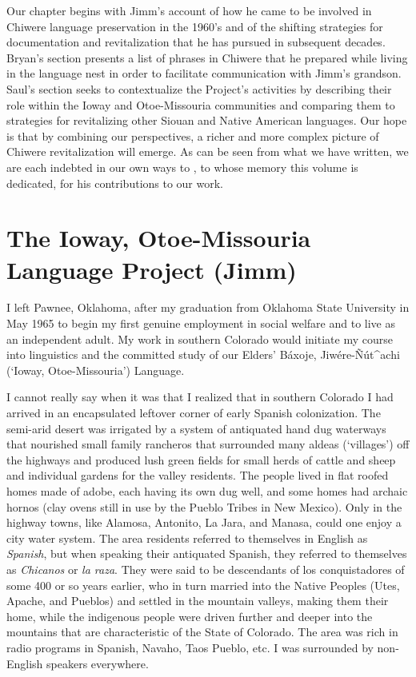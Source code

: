 \documentclass[output=paper]{LSP/langsci}
\begin{document}
Our chapter begins with Jimm's account of how he came to be involved in Chiwere language preservation in the 1960's and of the shifting strategies for documentation and revitalization that he has pursued in subsequent decades. Bryan's section presents a list of phrases in Chiwere that he prepared while living in the language nest in order to facilitate communication with Jimm's grandson. Saul's section seeks to contextualize the Project's activities by describing their role within the Ioway and Otoe-Missouria communities and comparing them to strategies for revitalizing other Siouan and Native American languages. Our hope is that by combining our perspectives, a richer and more complex picture of Chiwere revitalization will emerge. As can be seen from what we have written, we are each indebted in our own ways to , to whose memory this volume is dedicated, for his contributions to our work.

\section{The Ioway, Otoe-Missouria Language Project (Jimm)}
I left Pawnee, Oklahoma, after my graduation from Oklahoma State University in May 1965 to begin my first genuine employment in social welfare and to live as an independent adult. My work in southern Colorado would initiate my course into linguistics and the committed study of our Elders' Báxoje, Jiwére-\~Nút\^{ }achi (`Ioway, Otoe-Mis\-sou\-ria') Language.

I cannot really say when it was that I realized that in southern Colorado I had arrived in an encapsulated leftover corner of early Spanish colonization. The semi-arid desert was irrigated by a system of antiquated hand dug waterways that nourished small family rancheros that surrounded many aldeas (`villages') off the highways and produced lush green fields for small herds of cattle and sheep and individual gardens for the valley residents. The people lived in flat roofed homes made of adobe, each having its own dug well, and some homes had archaic hornos (clay ovens still in use by the Pueblo Tribes in New Mexico). Only in the highway towns, like Alamosa, Antonito, La Jara, and Manasa, could one enjoy a city water system. The area residents referred to themselves in English as \emph{Spanish}, but when speaking their antiquated Spanish, they referred to themselves as \emph{Chicanos} or \emph{la raza}. They were said to be descendants of los conquistadores of some 400 or so years earlier, who in turn married into the Native Peoples (Utes, Apache, and Pueblos) and settled in the mountain valleys, making them their home, while the indigenous people were driven further and deeper into the mountains that are characteristic of the State of Colorado. The area was rich in radio programs in Spanish, Navaho, Taos Pueblo, etc. I was surrounded by non-English speakers everywhere.
\end{document}
